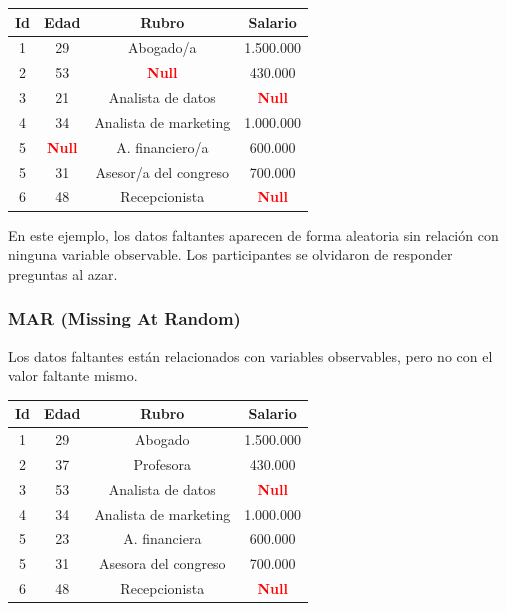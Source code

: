 \documentclass[12pt]{article}
\begin{document}
\vspace{0.5cm}
\begin{center}
\begin{tabular}{|c|c|c|c|}
\hline
\textbf{Id} & \textbf{Edad} & \textbf{Rubro} & \textbf{Salario} \\
\hline
1 & 29 & Abogado/a & 1.500.000 \\
\hline
2 & 53 & \textcolor{red}{\textbf{Null}} & 430.000 \\
\hline
3 & 21 & Analista de datos & \textcolor{red}{\textbf{Null}} \\
\hline
4 & 34 & Analista de marketing & 1.000.000 \\
\hline
5 & \textcolor{red}{\textbf{Null}} & A. financiero/a & 600.000 \\
\hline
5 & 31 & Asesor/a del congreso & 700.000 \\
\hline
6 & 48 & Recepcionista & \textcolor{red}{\textbf{Null}} \\
\hline
\end{tabular}
\end{center}
\vspace{0.5cm}

En este ejemplo, los datos faltantes aparecen de forma aleatoria sin relación con ninguna variable observable. Los participantes se olvidaron de responder preguntas al azar.

\subsubsection{MAR (Missing At Random)}
Los datos faltantes están relacionados con variables observables, pero no con el valor faltante mismo.

\vspace{0.5cm}
\begin{center}
\begin{tabular}{|c|c|c|c|}
\hline
\textbf{Id} & \textbf{Edad} & \textbf{Rubro} & \textbf{Salario} \\
\hline
1 & 29 & Abogado & 1.500.000 \\
\hline
2 & 37 & Profesora & 430.000 \\
\hline
3 & 53 & Analista de datos & \textcolor{red}{\textbf{Null}} \\
\hline
4 & 34 & Analista de marketing & 1.000.000 \\
\hline
5 & 23 & A. financiera & 600.000 \\
\hline
5 & 31 & Asesora del congreso & 700.000 \\
\hline
6 & 48 & Recepcionista & \textcolor{red}{\textbf{Null}} \\
\hline
\end{tabular}
\end{center}
\vspace{0.5cm}
\end{document}
